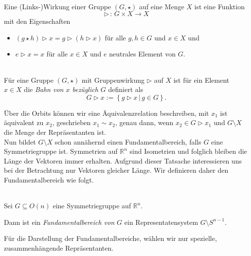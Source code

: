 \begin{definition}[Gruppenwirkung]\label{fundamentalbereich:wirking} \mbox{}\\
 Eine (Links-)Wirkung einer Gruppe $(G, \star)$ auf eine Menge $X$ ist eine Funktion
   $$
      \rhd \, : \, G \times X \longrightarrow X
   $$
   mit den Eigenschaften
   \begin{itemize}
      \item $(g \star h) \rhd x = g \rhd (h \rhd x)$ für alle $g,h \in G$ und $x \in X$ und
      \item $e \rhd x = x$ für alle $x \in X$ und $e$ neutrales Element von $G$.
   \end{itemize}
\end{definition}

\begin{definition}[Orbit] \label{fundamentalbereich:orbit} \mbox{}\\
  Für eine Gruppe $(G, \star)$ mit Gruppenwirkung $\rhd$ auf $X$ ist für ein Element $x \in X$ die \emph{Bahn von $x$ bezüglich $G$} definiert als
   $$
      G \rhd x := \left\{ g \rhd x \, | \, g \in G \right\}.
   $$
\end{definition}

Über die Orbits können wir eine Äquivalenzrelation beschreiben, mit $x_1$ ist äquivalent zu $x_2$, geschrieben $x_1 \sim x_2$, genau dann, wenn $x_2 \in G \rhd x_1$ und $G \setminus X$ die Menge der Repräsentanten ist.\\

Nun bildet $G \setminus X$ schon annähernd einen Fundamentalbereich, falls $G$ eine Symmetriegruppe ist. Symmetrien auf $\mathbb{R}^n$ sind Isometrien und folglich bleiben die Länge der Vektoren immer erhalten. Aufgrund dieser Tatsache interessieren uns bei der Betrachtung nur Vektoren gleicher Länge. Wir definieren daher den Fundamentalbereich wie folgt.\\

\begin{definition}[Fundamentalbereich]\label{fundamentalbereich:def} \mbox{}\\
   Sei $G \subseteq O(n)$ eine Symmetriegruppe auf $\mathbb{R}^n$.

   \noindent Dann ist ein \emph{Fundamentalbereich von $G$} ein Representatensystem $G \setminus S^{n-1}$.
\end{definition} 

Für die Darstellung der Fundamentalbereiche, wählen wir nur spezielle, zusammenhängende Repräsentanten.

